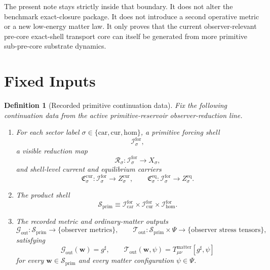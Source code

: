 \documentclass[11pt]{article}
\newcommand{\CompletedMetric}{g^{\sharp}}
\newcommand{\MatterSpace}{\Psi}
\newcommand{\Car}{\mathrm{car}}
\newcommand{\Cur}{\mathrm{cur}}
\newcommand{\Hom}{\mathrm{hom}}
\newcommand{\ForSpace}[1]{\mathcal I_{#1}^{\mathrm{for}}}
\newcommand{\PrimShell}{\mathcal S_{\mathrm{prim}}}
\newcommand{\Reduction}[1]{\mathcal R_{#1}}
\newcommand{\CurrentCarrier}[1]{\mathfrak C_{#1}^{\mathrm{cur}}}
\newcommand{\EqCarrier}[1]{\mathfrak C_{#1}^{\mathrm{eq}}}
\newcommand{\MetricOut}{\mathscr G_{\mathrm{out}}}
\newcommand{\MatterOut}{\mathscr T_{\mathrm{out}}}
\newtheorem{definition}{Definition}
\begin{document}
The present note stays strictly inside that boundary. It does not alter the benchmark exact-closure package. It does not introduce a second operative metric or a new low-energy matter law. It only proves that the current observer-relevant pre-core exact-shell transport core can itself be generated from more primitive sub-pre-core substrate dynamics.

\section{Fixed Inputs}

\begin{definition}[Recorded primitive continuation data]
\label{def:fixed}
Fix the following continuation data from the active primitive-reservoir observer-reduction line.
\begin{enumerate}
    \item For each sector label \(\sigma\in\{\Car,\Cur,\Hom\}\), a primitive forcing shell
    \[
    \ForSpace{\sigma},
    \]
    a visible reduction map
    \[
    \Reduction{\sigma}:\ForSpace{\sigma}\to X_{\sigma},
    \]
    and shell-level current and equilibrium carriers
    \[
    \CurrentCarrier{\sigma}:\ForSpace{\sigma}\to Z_{\sigma}^{\mathrm{cur}},
    \qquad
    \EqCarrier{\sigma}:\ForSpace{\sigma}\to Z_{\sigma}^{\mathrm{eq}}.
    \]
    \item The product shell
    \[
    \PrimShell
    \equiv
    \ForSpace{\Car}\times \ForSpace{\Cur}\times \ForSpace{\Hom}.
    \]
    \item The recorded metric and ordinary-matter outputs
    \[
    \MetricOut:\PrimShell\to\{\text{observer metrics}\},
    \qquad
    \MatterOut:\PrimShell\times\MatterSpace\to\{\text{observer stress tensors}\},
    \]
    satisfying
    \begin{equation}
    \MetricOut(\mathbf w)=\CompletedMetric,
    \qquad
    \MatterOut(\mathbf w,\psi)
    =
    T_{\mu\nu}^{\mathrm{matter}}[\CompletedMetric,\psi]
    \label{eq:fixedoutputs}
    \end{equation}
    for every \(\mathbf w\in\PrimShell\) and every matter configuration \(\psi\in\MatterSpace\).
\end{enumerate}
\end{definition}
\end{document}
